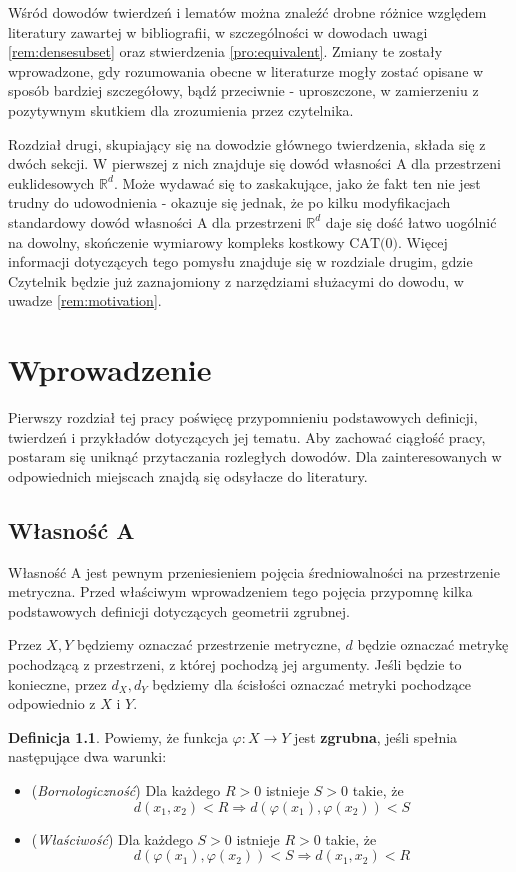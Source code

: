 \documentclass[licencjacka]{pracamgr}
\theoremstyle{definition}
\newtheorem{definition}{Definicja}[section]
\theoremstyle{definition}
\theoremstyle{definition}
\theoremstyle{definition}
\theoremstyle{definition}
\theoremstyle{plain}
\theoremstyle{plain}
\begin{document}
Wśród dowodów twierdzeń i lematów można znaleźć drobne różnice względem literatury 
zawartej w bibliografii, w szczególności w dowodach uwagi \ref{rem:densesubset} oraz 
stwierdzenia \ref{pro:equivalent}. Zmiany te zostały wprowadzone, gdy rozumowania 
obecne w literaturze mogły zostać opisane w sposób bardziej szczegółowy, bądź przeciwnie - 
uproszczone, w zamierzeniu z pozytywnym skutkiem dla zrozumienia przez czytelnika.

Rozdział drugi, skupiający się na dowodzie głównego twierdzenia, składa się z dwóch sekcji. 
W pierwszej z nich znajduje się dowód własności A dla przestrzeni euklidesowych 
$ \mathbb{R}^d $. Może wydawać się to zaskakujące, jako że fakt ten nie jest trudny do
udowodnienia - okazuje się jednak, że po kilku modyfikacjach standardowy dowód 
własności A dla przestrzeni $ \mathbb{R}^d $ daje się dość łatwo uogólnić na dowolny, 
skończenie wymiarowy kompleks kostkowy $ \text{CAT(0)}$. Więcej informacji dotyczących 
tego pomysłu znajduje się w rozdziale drugim, gdzie Czytelnik będzie już zaznajomiony 
z narzędziami służacymi do dowodu, w uwadze \ref{rem:motivation}.
\chapter{Wprowadzenie}

Pierwszy rozdział tej pracy poświęcę przypomnieniu podstawowych definicji, 
twierdzeń i przykładów dotyczących jej tematu. Aby zachować ciągłość pracy, 
postaram się uniknąć przytaczania rozległych dowodów. Dla zainteresowanych 
w odpowiednich miejscach znajdą się odsyłacze do literatury.

\section{Własność A}

Własność A jest pewnym przeniesieniem pojęcia średniowalności na przestrzenie metryczna. 
Przed właściwym wprowadzeniem tego pojęcia przypomnę kilka podstawowych 
definicji dotyczących geometrii zgrubnej.

Przez $ X,Y $ będziemy oznaczać przestrzenie metryczne, $ d $ będzie oznaczać metrykę 
pochodzącą z przestrzeni, z której pochodzą jej argumenty. Jeśli będzie to konieczne, 
przez $ d_X, d_Y $ będziemy dla ścisłości oznaczać metryki pochodzące odpowiednio z $ X $ 
i $ Y $.

\begin{definition}
	Powiemy, że funkcja $ \varphi: X \rightarrow Y $ jest \textbf{zgrubna}, jeśli 
	spełnia następujące dwa warunki:
	\begin{itemize}
	\item (\textit{Bornologiczność}) Dla każdego $ R > 0 $ istnieje $ S > 0 $ 
	takie, że 
	$$ d(x_1,x_2) < R \Rightarrow d \left( \varphi(x_1), \varphi(x_2)\right) < S $$
	\item (\textit{Właściwość}) Dla każdego $ S > 0 $ istnieje $ R > 0 $ takie, że 
	$$ d\left(\varphi(x_1), \varphi(x_2)\right) < S \Rightarrow d(x_1,x_2) < R $$
	\end{itemize}
\end{definition}
\end{document}

